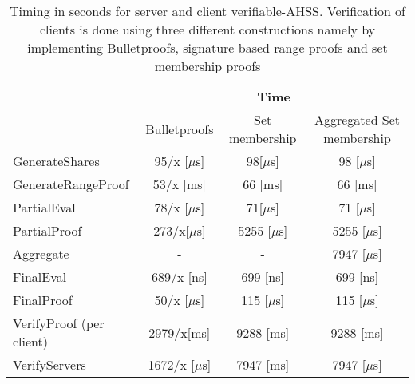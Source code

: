 

\begin{table}
\caption{Timing in seconds for server and client verifiable-AHSS. Verification of clients is done using three different constructions namely  by implementing  Bulletproofs, signature based range proofs and set membership proofs}
\centering
\label{tab:BenchBP}
\begin{tabular}{l  c c c}

&   \multicolumn{3}{c}{\textbf{Time}}   		\\ 
    																	& Bulletproofs  & Set membership & Aggregated Set membership \\	\toprule
  GenerateShares 				  					&   95/x [$\mu$s]			 &98[$\mu$s]  &98 [$\mu$s]												\\ 
  GenerateRangeProof  						&   53/x [ms]				& 	66 [ms]	&66 [ms]			\\ 
  PartialEval  										&   78/x	[$\mu$s]				&71[$\mu$s]	 		&	71	 [$\mu$s]							\\ 
  PartialProof 									&   273/x[$\mu$s]						& 5255 [$\mu$s]			& 5255 [$\mu$s]				\\ 
   Aggregate										&   -				&		-	&		7947 [$\mu$s]					\\ 
  FinalEval  											&   689/x [ns]						&699  [ns]				&			699  [ns]												\\ 
  FinalProof  												&   50/x	[$\mu$s]			&  115 [$\mu$s]	&				115 [$\mu$s]									\\ 
  VerifyProof	(per client)						  							&   2979/x[ms]					& 9288 [ms]&					9288 [ms]							\\ 
  VerifyServers											&   1672/x [$\mu$s]					&		7947 [ms] 	&		7947 [$\mu$s]					\\ 
  \bottomrule
\end{tabular}
\end{table}